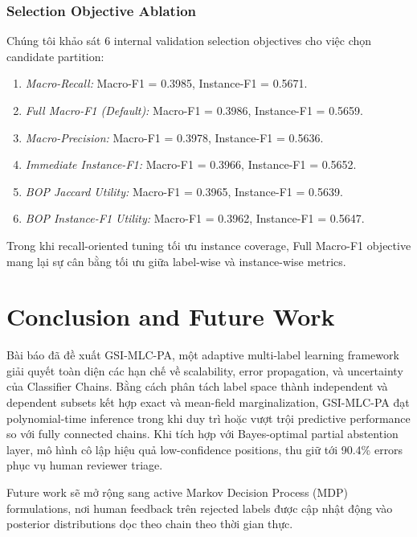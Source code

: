 \documentclass[conference]{IEEEtran}
\begin{document}
\subsubsection{Selection Objective Ablation}
Chúng tôi khảo sát 6 internal validation selection objectives cho việc chọn candidate partition:
\begin{enumerate}
    \item \textit{Macro-Recall:} Macro-F1 = 0.3985, Instance-F1 = 0.5671.
    \item \textit{Full Macro-F1 (Default):} Macro-F1 = 0.3986, Instance-F1 = 0.5659.
    \item \textit{Macro-Precision:} Macro-F1 = 0.3978, Instance-F1 = 0.5636.
    \item \textit{Immediate Instance-F1:} Macro-F1 = 0.3966, Instance-F1 = 0.5652.
    \item \textit{BOP Jaccard Utility:} Macro-F1 = 0.3965, Instance-F1 = 0.5639.
    \item \textit{BOP Instance-F1 Utility:} Macro-F1 = 0.3962, Instance-F1 = 0.5647.
\end{enumerate}
Trong khi recall-oriented tuning tối ưu instance coverage, Full Macro-F1 objective mang lại sự cân bằng tối ưu giữa label-wise và instance-wise metrics.

\section{Conclusion and Future Work}
Bài báo đã đề xuất GSI-MLC-PA, một adaptive multi-label learning framework giải quyết toàn diện các hạn chế về scalability, error propagation, và uncertainty của Classifier Chains. Bằng cách phân tách label space thành independent và dependent subsets kết hợp exact và mean-field marginalization, GSI-MLC-PA đạt polynomial-time inference trong khi duy trì hoặc vượt trội predictive performance so với fully connected chains. Khi tích hợp với Bayes-optimal partial abstention layer, mô hình cô lập hiệu quả low-confidence positions, thu giữ tới 90.4\% errors phục vụ human reviewer triage.

Future work sẽ mở rộng sang active Markov Decision Process (MDP) formulations, nơi human feedback trên rejected labels được cập nhật động vào posterior distributions dọc theo chain theo thời gian thực.
\end{document}
